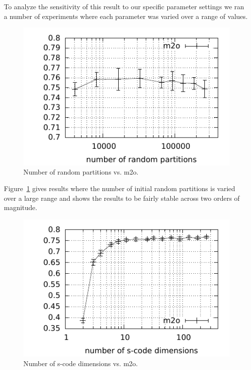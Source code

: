 \documentclass[11pt]{article}
\begin{document}
To analyze the sensitivity of this result to our specific parameter
settings we ran a number of experiments where each parameter was
varied over a range of values.

\begin{figure}[ht] \centering
\includegraphics[width=\linewidth]{plot-p.pdf}
\caption{Number of random partitions vs. m2o.}
\label{plot-p}
\end{figure}

Figure~\ref{plot-p} gives results where the number of initial random
partitions is varied over a large range and shows the results to be
fairly stable across two orders of magnitude.

\begin{figure}[ht] \centering
\includegraphics[width=\linewidth]{plot-d.pdf}
\caption{Number of s-code dimensions vs. m2o.}
\label{plot-d}
\end{figure}
\end{document}
